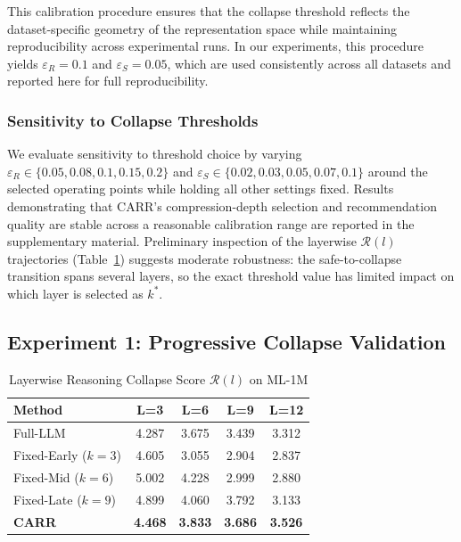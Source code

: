 \documentclass[lettersize,journal]{IEEEtran}
\begin{document}
This calibration procedure ensures that the collapse threshold reflects the dataset-specific geometry of the representation space while maintaining reproducibility across experimental runs. In our experiments, this procedure yields $\varepsilon_R = 0.1$ and $\varepsilon_S = 0.05$, which are used consistently across all datasets and reported here for full reproducibility.

\subsubsection{Sensitivity to Collapse Thresholds}
We evaluate sensitivity to threshold choice by varying $\varepsilon_R \in \{0.05, 0.08, 0.1, 0.15, 0.2\}$ and $\varepsilon_S \in \{0.02, 0.03, 0.05, 0.07, 0.1\}$ around the selected operating points while holding all other settings fixed. Results demonstrating that CARR's compression-depth selection and recommendation quality are stable across a reasonable calibration range are reported in the supplementary material. Preliminary inspection of the layerwise $\mathcal{R}(l)$ trajectories (Table~\ref{tab:collapse}) suggests moderate robustness: the safe-to-collapse transition spans several layers, so the exact threshold value has limited impact on which layer is selected as $k^*$.

\subsection{Experiment 1: Progressive Collapse Validation}

\begin{table}[!t]
\caption{Layerwise Reasoning Collapse Score $\mathcal{R}(l)$ on ML-1M\label{tab:collapse}}
\centering
\begin{tabular}{l|cccc}
\toprule
\textbf{Method} & \textbf{L=3} & \textbf{L=6} & \textbf{L=9} & \textbf{L=12} \\
\midrule
Full-LLM & 4.287 & 3.675 & 3.439 & 3.312 \\
Fixed-Early ($k=3$) & 4.605 & 3.055 & 2.904 & 2.837 \\
Fixed-Mid ($k=6$) & 5.002 & 4.228 & 2.999 & 2.880 \\
Fixed-Late ($k=9$) & 4.899 & 4.060 & 3.792 & 3.133 \\
\textbf{CARR} & \textbf{4.468} & \textbf{3.833} & \textbf{3.686} & \textbf{3.526} \\
\bottomrule
\end{tabular}
\end{table}
\end{document}
